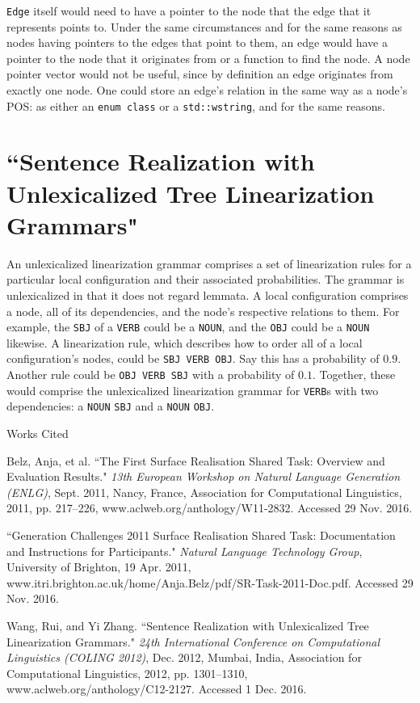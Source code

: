 \documentclass[12pt,letterpaper]{article}
\newenvironment{workscited}{
  \newcommand{\bibentry}{\noindent{}\hangindent=0.5in}
  \newpage{}
  {\centering{}Works Cited\par{}}
}{\newpage{}}
\begin{document}
\begin{flushleft}
  \texttt{Edge} itself would need to have a pointer to the node that the edge that it represents points to. Under the same circumstances and for the same reasons as nodes having pointers to the edges that point to them, an edge would have a pointer to the node that it originates from or a function to find the node. A node pointer vector would not be useful, since by definition an edge originates from exactly one node. One could store an edge's relation in the same way as a node's POS: as either an \texttt{enum class} or a \texttt{std::wstring}, and for the same reasons.
  \section*{``Sentence Realization with Unlexicalized Tree Linearization Grammars"}
  An unlexicalized linearization grammar comprises a set of linearization rules for a particular local configuration and their associated probabilities. The grammar is unlexicalized in that it does not regard lemmata. A local configuration comprises a node, all of its dependencies, and the node's respective relations to them. For example, the \texttt{SBJ} of a \texttt{VERB} could be a \texttt{NOUN}, and the \texttt{OBJ} could be a \texttt{NOUN} likewise. A linearization rule, which describes how to order all of a local configuration's nodes, could be \texttt{SBJ VERB OBJ}. Say this has a probability of $0.9$. Another rule could be \texttt{OBJ VERB SBJ} with a probability of $0.1$. Together, these would comprise the unlexicalized linearization grammar for \texttt{VERB}s with two dependencies: a \texttt{NOUN} \texttt{SBJ} and a \texttt{NOUN} \texttt{OBJ}.
  \begin{workscited}
    \bibentry{}Belz, Anja, et al. ``The First Surface Realisation Shared Task: Overview and Evaluation Results." \textit{13th European Workshop on Natural Language Generation (ENLG)}, Sept. 2011, Nancy, France, Association for Computational Linguistics, 2011, pp. 217--226, www.aclweb.org/anthology/W11-2832. Accessed 29 Nov. 2016.

    \bibentry{}``Generation Challenges 2011 Surface Realisation Shared Task: Documentation and Instructions for Participants." \textit{Natural Language Technology Group}, University of Brighton, 19 Apr. 2011, www.itri.brighton.ac.uk/home/Anja.Belz/pdf/SR-Task-2011-Doc.pdf. Accessed 29 Nov. 2016.

    \bibentry{}Wang, Rui, and Yi Zhang. ``Sentence Realization with Unlexicalized Tree Linearization Grammars." \textit{24th International Conference on Computational Linguistics (COLING 2012)}, Dec. 2012, Mumbai, India, Association for Computational Linguistics, 2012, pp. 1301--1310, www.aclweb.org/anthology/C12-2127. Accessed 1 Dec. 2016.
  \end{workscited}
\end{flushleft}
\end{document}
